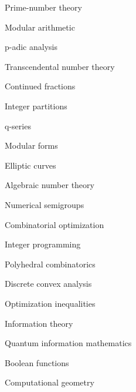 \item Prime-number theory
\item Modular arithmetic
\item p-adic analysis
\item Transcendental number theory
\item Continued fractions
\item Integer partitions
\item q-series
\item Modular forms
\item Elliptic curves
\item Algebraic number theory
\item Numerical semigroups
\item Combinatorial optimization
\item Integer programming
\item Polyhedral combinatorics
\item Discrete convex analysis
\item Optimization inequalities
\item Information theory
\item Quantum information mathematics
\item Boolean functions
\item Computational geometry
